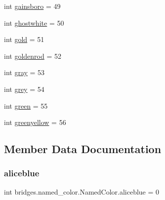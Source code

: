\begin{DoxyCompactItemize}
\item 
int \hyperlink{classbridges_1_1named__color_1_1_named_color_a8866818165b26630e090baa4a89b1bc7}{gainsboro} = 49
\item 
int \hyperlink{classbridges_1_1named__color_1_1_named_color_a99ebdd82da9c43160e4b15db14949331}{ghostwhite} = 50
\item 
int \hyperlink{classbridges_1_1named__color_1_1_named_color_a16c6d7b9f14e692ee6777dc57411c8d1}{gold} = 51
\item 
int \hyperlink{classbridges_1_1named__color_1_1_named_color_af862c3a7a14c7ed23e2bc930c2d70f6a}{goldenrod} = 52
\item 
int \hyperlink{classbridges_1_1named__color_1_1_named_color_ac17e0a126788432dd3647a1a48437150}{gray} = 53
\item 
int \hyperlink{classbridges_1_1named__color_1_1_named_color_a3dc30e5aee94cec59d191fdd8ddee470}{grey} = 54
\item 
int \hyperlink{classbridges_1_1named__color_1_1_named_color_a9051adaf62d438732ca2d7935f80b897}{green} = 55
\item 
int \hyperlink{classbridges_1_1named__color_1_1_named_color_ae65bb5eb13a8d982c70776d7e37fa3fa}{greenyellow} = 56
\end{DoxyCompactItemize}


\subsection{Member Data Documentation}
\mbox{\label{classbridges_1_1named__color_1_1_named_color_aee5ed43983f4942acabae2cb74b9c6fd}} 
\subsubsection{\texorpdfstring{aliceblue}{aliceblue}}
{\footnotesize\ttfamily int bridges.\+named\+\_\+color.\+Named\+Color.\+aliceblue = 0\hspace{0.3cm}{\ttfamily [static]}}

\mbox{\label{classbridges_1_1named__color_1_1_named_color_a095e0f1c39cca4646342de08f3e2ae08}} 
